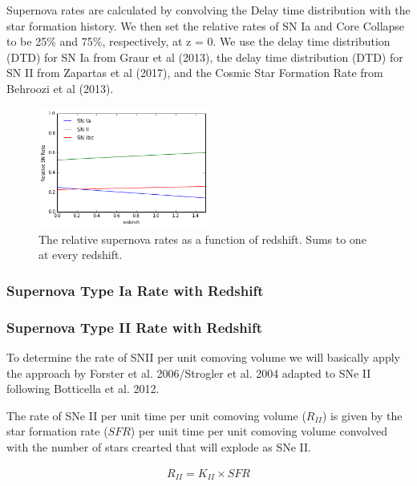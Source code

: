 \documentclass[12pt, onecolumn]{emulateapj}
\begin{document}
Supernova rates are calculated by convolving the Delay time distribution with the star formation history. We then set the relative rates of SN Ia and Core Collapse to be 25\% and 75\%, respectively, at z = 0. We use the delay time distribution (DTD) for SN Ia from Graur et al (2013), the delay time distribution (DTD) for SN II from Zapartas et al (2017), and the Cosmic Star Formation Rate from Behroozi et al (2013).

\begin{figure}
	\begin{center}
		\includegraphics[width=0.5\textwidth]{relative_supernova_rate.png}
		\caption{The relative supernova rates as a function of redshift. Sums to one at every redshift.}
		\label{fig:realtive_supernova_rates}
	\end{center}
\end{figure}

\subsubsection{Supernova Type Ia Rate with Redshift}
\label{sec:TypeIaRate}

\subsubsection{Supernova Type II Rate with Redshift}
\label{sec:TypeIIRate}

To determine the rate of SNII per unit comoving volume we will basically apply the approach by Forster et al. 2006/Strogler et al. 2004 adapted to SNe II following Botticella et al. 2012.

The rate of SNe II per unit time per unit comoving volume ($R_{II}$) is given by the star formation rate ($SFR$) per unit time per unit comoving volume convolved with the number of stars crearted that will explode as SNe II.

\begin{align}
	\label{eq:rateII}
	R_{II} = K_{II} \times SFR
\end{align}
\end{document}

